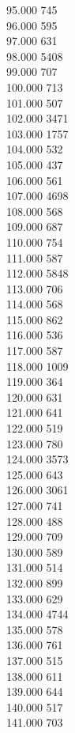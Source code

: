 { 95.000	745 \\
 96.000	595 \\
 97.000	631 \\
 98.000	5408 \\
 99.000	707 \\
 100.000	713 \\
 101.000	507 \\
 102.000	3471 \\
 103.000	1757 \\
 104.000	532 \\
 105.000	437 \\
 106.000	561 \\
 107.000	4698 \\
 108.000	568 \\
 109.000	687 \\
 110.000	754 \\
 111.000	587 \\
 112.000	5848 \\
 113.000	706 \\
 114.000	568 \\
 115.000	862 \\
 116.000	536 \\
 117.000	587 \\
 118.000	1009 \\
 119.000	364 \\
 120.000	631 \\
 121.000	641 \\
 122.000	519 \\
 123.000	780 \\
 124.000	3573 \\
 125.000	643 \\
 126.000	3061 \\
 127.000	741 \\
 128.000	488 \\
 129.000	709 \\
 130.000	589 \\
 131.000	514 \\
 132.000	899 \\
 133.000	629 \\
 134.000	4744 \\
 135.000	578 \\
 136.000	761 \\
 137.000	515 \\
 138.000	611 \\
 139.000	644 \\
 140.000	517 \\
 141.000	703 \\
}
